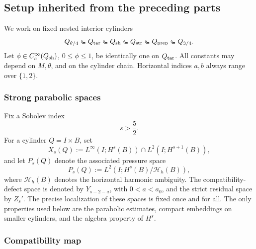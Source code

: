 \documentclass[11pt]{article}
\numberwithin{equation}{section}
\theoremstyle{plain}
\theoremstyle{definition}
\theoremstyle{remark}
\begin{document}
\subsection{Setup inherited from the preceding parts}\label{pIV:sec:setup}

We work on fixed nested interior cylinders
\begin{equation}\label{pIV:eq:cylinder-chain}
        Q_{\theta/4}\Subset Q_{\rm tar}\Subset Q_{\rm sh}
        \Subset Q_{\rm str}\Subset Q_{\rm prep}\Subset Q_{3/4}.
\end{equation}
Let \(\phi\in C_c^\infty(Q_{\rm sh})\), \(0\le \phi\le1\), be identically one on
\(Q_{\rm tar}\).  All constants may depend on \(M,\theta\), and on the cylinder
chain.  Horizontal indices \(a,b\) always range over \(\{1,2\}\).

\subsubsection{Strong parabolic spaces}

Fix a Sobolev index
\begin{equation}\label{pIV:eq:s-index}
        s>\frac52.
\end{equation}
For a cylinder \(Q=I\times B\), set
\begin{equation}\label{pIV:eq:Xs}
        X_s(Q):=L^\infty(I;H^s(B))\cap L^2(I;H^{s+1}(B)),
\end{equation}
and let \(P_s(Q)\) denote the associated pressure space
\begin{equation}\label{pIV:eq:Ps}
        P_s(Q):=L^2(I;H^s(B)/\mathcal H_h(B)),
\end{equation}
where \(\mathcal H_h(B)\) denotes the horizontal harmonic ambiguity.  The
compatibility-defect space is denoted by \(Y_{s-2-a}\), with \(0<a<a_0\), and the
strict residual space by \(Z_s'\).  The precise localization of these spaces is fixed
once and for all.  The only properties used below are the parabolic estimates, compact
embeddings on smaller cylinders, and the algebra property of \(H^s\).

\subsubsection{Compatibility map}
\end{document}
